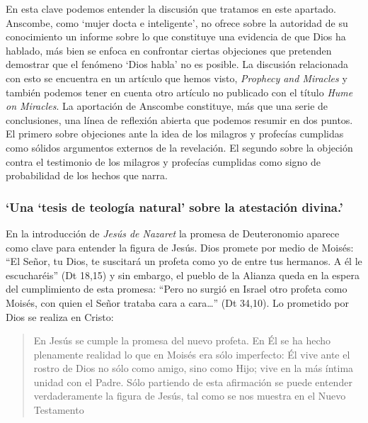 En esta clave podemos entender la discusión que tratamos en este apartado. Anscombe, como `mujer docta e inteligente', no ofrece sobre la autoridad de su conocimiento un informe sobre lo que constituye una evidencia de que Dios ha hablado, más bien se enfoca en confrontar ciertas objeciones que pretenden demostrar que el fenómeno `Dios habla' no es posible. La discusión relacionada con esto se encuentra en un artículo que hemos visto, \emph{Prophecy and Miracles} y también podemos tener en cuenta otro artículo no publicado con el título \emph{Hume on Miracles}. La aportación de Anscombe constituye, más que una serie de conclusiones, una línea de reflexión abierta que podemos resumir en dos puntos. El primero sobre objeciones ante la idea de los milagros y profecías cumplidas como sólidos argumentos externos de la revelación. El segundo sobre la objeción contra el testimonio de los milagros y profecías cumplidas como signo de probabilidad de los hechos que narra.

\subsubsection{\enquote*{Una `tesis de teología natural' sobre la atestación divina.}}

En la introducción de \emph{Jesús de Nazaret} la promesa de Deuteronomio aparece como clave para entender la figura de Jesús. Dios promete por medio de Moisés: \enquote{El Señor, tu Dios, te suscitará un profeta como yo de entre tus hermanos. A él le escucharéis} (Dt 18,15) y sin embargo, el pueblo de la Alianza queda en la espera del cumplimiento de esta promesa: \enquote{Pero no surgió en Israel otro profeta como Moisés, con quien el Señor trataba cara a cara\ldots} (Dt 34,10). Lo prometido por Dios se realiza en Cristo: \blockquote[{\cite[28]{ratzinger2007jdenaz}}]{En Jesús se cumple la promesa del nuevo profeta. En Él se ha hecho plenamente realidad lo que en Moisés era sólo imperfecto: Él vive ante el rostro de Dios no sólo como amigo, sino como Hijo; vive en la más íntima unidad con el Padre. Sólo partiendo de esta afirmación se puede entender verdaderamente la figura de Jesús, tal como se nos muestra en el Nuevo Testamento}


